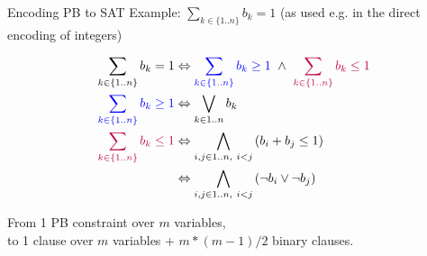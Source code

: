\documentclass{cons-beamer}
\begin{document}
\begin{frame}{Encoding PB to SAT}
  Example: $\sum_{k \in \{1..n\}} b_{k} = 1$ (as used e.g. in the direct encoding of integers)

  \begin{align}
    \sum_{k \in \{1..n\}} b_{k} = 1 &\Leftrightarrow
        \textcolor{blue}{\sum_{k \in \{1..n\}} b_{k} \geq 1} ~\wedge~
        \textcolor{purple}{\sum_{k \in \{1..n\}} b_{k} \leq 1} \\
    \textcolor{blue}{\sum_{k \in \{1..n\}} b_{k} \geq 1} &\Leftrightarrow
          \bigvee_{k \in 1..n} b_k \\
    \textcolor{purple}{\sum_{k \in \{1..n\}} b_{k} \leq 1} 
      & \Leftrightarrow \bigwedge_{i,j \in 1..n,~ i < j} \left(b_i + b_j \leq 1\right) \\
      & \Leftrightarrow \bigwedge_{i,j \in 1..n,~ i < j} \left(\neg b_i \lor \neg b_j\right)
  \end{align}

  From 1 PB constraint over $m$ variables, \\
  to 1 clause over $m$ variables + $m*(m-1)/2$ binary clauses.
\end{frame}
\end{document}

